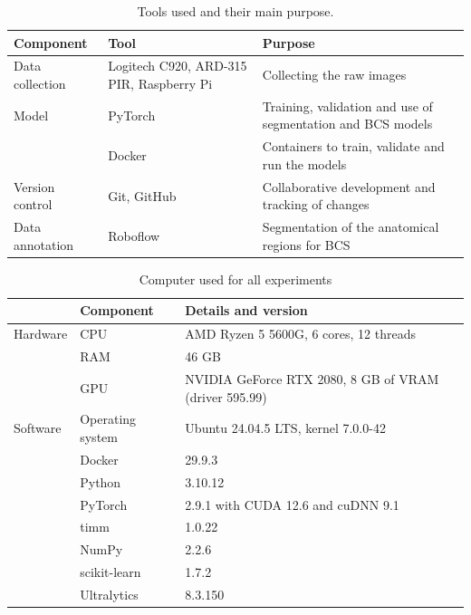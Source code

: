 \begin{table}[!htbp]
  \centering
  \caption{Tools used and their main purpose.}
  \label{tab:tools}
  \begin{tabularx}{\textwidth}{>{\raggedright\arraybackslash}p{2.8cm}>{\raggedright\arraybackslash}p{4.4cm}X}
    \toprule
    Component & Tool & Purpose \\
    \midrule
    Data collection & Logitech C920, ARD-315 PIR, Raspberry Pi & Collecting the raw images \\
    Model & PyTorch & Training, validation and use of segmentation and BCS models \\
          & Docker & Containers to train, validate and run the models \\
    Version control & Git, GitHub & Collaborative development and tracking of changes \\
    Data annotation & Roboflow & Segmentation of the anatomical regions for BCS \\
    \bottomrule
  \end{tabularx}
\end{table}

\begin{table}[!htbp]
  \centering
  \caption{Computer used for all experiments}
  \label{tab:computer}
  {\begin{tabular}{lll}
    \toprule
    & Component & Details and version \\
    \midrule
    Hardware & CPU & AMD Ryzen 5 5600G, 6 cores, 12 threads \\
             & RAM & 46 GB \\
             & GPU & NVIDIA GeForce RTX 2080, 8 GB of VRAM (driver 595.99) \\
    Software & Operating system & Ubuntu 24.04.5 LTS, kernel 7.0.0-42 \\
             & Docker & 29.9.3 \\
             & Python & 3.10.12 \\
             & PyTorch & 2.9.1 with CUDA 12.6 and cuDNN 9.1 \\
             & timm & 1.0.22 \\
             & NumPy & 2.2.6 \\
             & scikit-learn & 1.7.2 \\
             & Ultralytics & 8.3.150 \\
    \bottomrule
  \end{tabular}}
\end{table}

